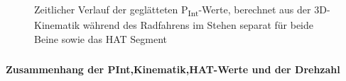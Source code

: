 \documentclass[
  letterpaper,
  DIV=11]{scrartcl}
\makeatletter
\let\oldsubparagraph\subparagraph
\renewcommand{\subparagraph}{
    \@ifstar
      \xxxSubParagraphStar
      \xxxSubParagraphNoStar
  }
\newcommand{\xxxSubParagraphStar}[1]{\oldsubparagraph*{#1}\mbox{}}
\newcommand{\xxxSubParagraphNoStar}[1]{\oldsubparagraph{#1}\mbox{}}
\makeatother
\begin{document}
\begin{figure}


\caption{\label{fig-PInt_Kinematik_HAT_Pint_stehen}Zeitlicher Verlauf
der geglätteten P\textsubscript{Int}-Werte, berechnet aus der
3D-Kinematik während des Radfahrens im Stehen separat für beide Beine
sowie das HAT Segment}

\end{figure}%

\subparagraph{\texorpdfstring{\textbf{Zusammenhang der
PInt,Kinematik,HAT-Werte und der
Drehzahl}}{Zusammenhang der PInt,Kinematik,HAT-Werte und der Drehzahl}}\label{zusammenhang-der-pintkinematikhat-werte-und-der-drehzahl}
\end{document}
